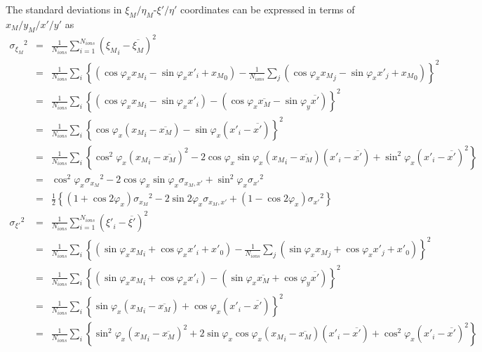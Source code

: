 \documentclass{article}
\begin{document}
The standard deviations in $\xi_M/\eta_M$-$\xi'/\eta'$ coordinates can be expressed in terms of $x_M/y_M/x'/y'$ as
\begin{eqnarray*}
{\sigma_{\xi_M}}^2 & = & \frac{1}{N_{ions}} \sum_{i=1}^{N_{ions}} ({\xi_M}_i - \overline{\xi_M})^2 \\
& = & \frac{1}{N_{ions}} \sum_i \left\{ \left( \cos{\varphi_x} {x_M}_i - \sin{\varphi_x} {x'}_i + {x_M}_0 \right) - \frac{1}{N_{ions}}\sum_j \left( \cos{\varphi_x} {x_M}_j - \sin{\varphi_x} {x'}_j + {x_M}_0 \right) \right\}^2 \\
& = & \frac{1}{N_{ions}} \sum_i \left\{ \left( \cos{\varphi_x}{x_M}_i - \sin{\varphi_x}{x'}_i \right) - \left( \cos{\varphi_x}\overline{x_M} - \sin{\varphi_y}\overline{x'} \right) \right\}^2 \\
& = & \frac{1}{N_{ions}} \sum_i \left\{ \cos{\varphi_x} \left( {x_M}_i - \overline{x_M} \right) - \sin{\varphi_x} \left( {x'}_i - \overline{x'} \right) \right\}^2 \\
& = & \frac{1}{N_{ions}} \sum_i \left\{ \cos^2{\varphi_x} \left( {x_M}_i - \overline{x_M} \right)^2 - 2\cos{\varphi_x}\sin{\varphi_x} \left( {x_M}_i-\overline{x_M} \right) \left( {x'}_i-\overline{x'} \right) + \sin^2{\varphi_x}\left( {x'}_i - \overline{x'} \right)^2 \right\} \\
& = & \cos^2{\varphi_x} {\sigma_{x_M}}^2 -2\cos{\varphi_x}\sin{\varphi_x} \sigma_{x_M,x'} + \sin^2{\varphi_x} {\sigma_{x'}}^2 \\
& = & \frac{1}{2} \left\{ \left(1+\cos{2\varphi_x}\right) {\sigma_{x_M}}^2 - 2\sin{2\varphi_x}\sigma_{x_M,x'} + \left(1-\cos{2\varphi_x}\right) {\sigma_{x'}}^2 \right\} \\
{\sigma_{\xi'}}^2 & = & \frac{1}{N_{ions}} \sum_{i=1}^{N_{ions}} ({\xi'}_i - \overline{\xi'})^2 \\
& = & \frac{1}{N_{ions}} \sum_i \left\{ \left( \sin{\varphi_x} {x_M}_i + \cos{\varphi_x} {x'}_i + {x'}_0 \right) - \frac{1}{N_{ions}}\sum_j \left( \sin{\varphi_x} {x_M}_j + \cos{\varphi_x} {x'}_j + {x'}_0 \right) \right\}^2 \\
& = & \frac{1}{N_{ions}} \sum_i \left\{ \left( \sin{\varphi_x}{x_M}_i + \cos{\varphi_x}{x'}_i \right) - \left( \sin{\varphi_x}\overline{x_M} + \cos{\varphi_y}\overline{x'} \right) \right\}^2 \\
& = & \frac{1}{N_{ions}} \sum_i \left\{ \sin{\varphi_x} \left( {x_M}_i - \overline{x_M} \right) + \cos{\varphi_x} \left( {x'}_i - \overline{x'} \right) \right\}^2 \\
& = & \frac{1}{N_{ions}} \sum_i \left\{ \sin^2{\varphi_x} \left( {x_M}_i - \overline{x_M} \right)^2 + 2\sin{\varphi_x}\cos{\varphi_x} \left( {x_M}_i-\overline{x_M} \right) \left( {x'}_i-\overline{x'} \right) + \cos^2{\varphi_x}\left( {x'}_i - \overline{x'} \right)^2 \right\} \\

\end{eqnarray*}
\end{document}
